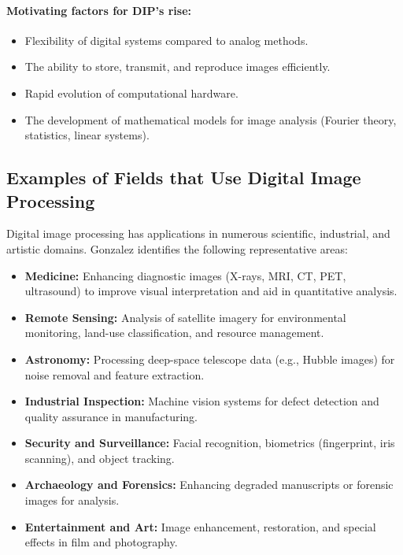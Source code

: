 \documentclass[12pt,a4paper]{AnantDocumentation}
\begin{document}
\paragraph{Motivating factors for DIP’s rise:}
\begin{itemize}
\item Flexibility of digital systems compared to analog methods.
\item The ability to store, transmit, and reproduce images efficiently.
\item Rapid evolution of computational hardware.
\item The development of mathematical models for image analysis (Fourier theory, statistics, linear systems).
\end{itemize}

\subsection{Examples of Fields that Use Digital Image Processing}
Digital image processing has applications in numerous scientific, industrial, and artistic domains. Gonzalez identifies the following representative areas:

\begin{itemize}
\item \textbf{Medicine:} Enhancing diagnostic images (X-rays, MRI, CT, PET, ultrasound) to improve visual interpretation and aid in quantitative analysis.
\item \textbf{Remote Sensing:} Analysis of satellite imagery for environmental monitoring, land-use classification, and resource management.
\item \textbf{Astronomy:} Processing deep-space telescope data (e.g., Hubble images) for noise removal and feature extraction.
\item \textbf{Industrial Inspection:} Machine vision systems for defect detection and quality assurance in manufacturing.
\item \textbf{Security and Surveillance:} Facial recognition, biometrics (fingerprint, iris scanning), and object tracking.
\item \textbf{Archaeology and Forensics:} Enhancing degraded manuscripts or forensic images for analysis.
\item \textbf{Entertainment and Art:} Image enhancement, restoration, and special effects in film and photography.
\end{itemize}
\end{document}
